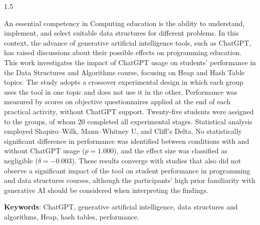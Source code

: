 
\begin{resumo}[ABSTRACT]
\begin{Spacing}{1.5}

An essential competency in Computing education is the ability to understand, implement, and select suitable data structures for different problems. In this context, the advance of generative artificial intelligence tools, such as ChatGPT, has raised discussions about their possible effects on programming education. This work investigates the impact of ChatGPT usage on students' performance in the Data Structures and Algorithms course, focusing on Heap and Hash Table topics. The study adopts a crossover experimental design in which each group uses the tool in one topic and does not use it in the other. Performance was measured by scores on objective questionnaires applied at the end of each practical activity, without ChatGPT support. Twenty-five students were assigned to the groups, of whom 20 completed all experimental stages. Statistical analysis employed Shapiro--Wilk, Mann--Whitney U, and Cliff's Delta. No statistically significant difference in performance was identified between conditions with and without ChatGPT usage ($p = 1.000$), and the effect size was classified as negligible ($\delta = -0.003$). These results converge with studies that also did not observe a significant impact of the tool on student performance in programming and data structures courses, although the participants' high prior familiarity with generative AI should be considered when interpreting the findings.

\end{Spacing}

\vspace{1cm}
\textbf{Keywords}: ChatGPT, generative artificial intelligence, data structures and algorithms, Heap, hash tables, performance.

\end{resumo}


